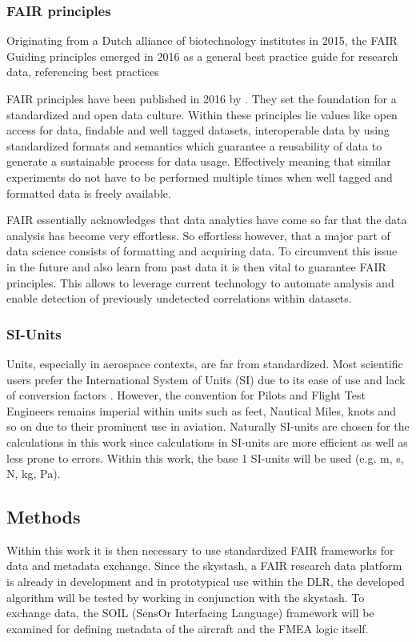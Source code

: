 \subsubsection{FAIR principles}

Originating from a Dutch alliance of biotechnology institutes in 2015, the FAIR Guiding principles emerged in 2016 as a general best practice guide for research data, referencing best practices

FAIR principles have been published in 2016 by \textcite{wilkinson_fair_2016}. They set the foundation for a standardized and open data culture. Within these principles lie values like open access for data, findable and well tagged datasets, interoperable data by using standardized formats and semantics which guarantee a reusability of data to generate a sustainable process for data usage. Effectively meaning that similar experiments do not have to be performed multiple times when well tagged and formatted data is freely available.


FAIR essentially acknowledges that data analytics have come so far that the data analysis has become very effortless. So effortless however, that a major part of data science consists of formatting and acquiring data. To circumvent this issue in the future and also learn from past data it is then vital to guarantee FAIR principles. This allows to leverage current technology to automate analysis and enable detection of previously undetected correlations within datasets.

\subsubsection{SI-Units}
Units, especially in aerospace contexts, are far from standardized. Most scientific users prefer the International System of Units (SI) due to its ease of use and lack of conversion factors \cite{newell_international_2019}. However, the convention for Pilots and Flight Test Engineers remains imperial within units such as feet, Nautical Miles, knots and so on due to their prominent use in aviation. Naturally SI-units are chosen for the calculations in this work since calculations in SI-units are more efficient as well as less prone to errors. Within this work, the base 1 SI-units will be used (e.g. m, s, N, kg, Pa).

\subsection{Methods}
Within this work it is then necessary to use standardized FAIR frameworks for data and metadata exchange. Since the skystash, a FAIR research data platform is already in development and in prototypical use within the DLR, the developed algorithm will be tested by working in conjunction with the skystash. To exchange data, the SOIL (SensOr Interfacing Language) framework will be examined for defining metadata of the aircraft and the FMEA logic itself.

